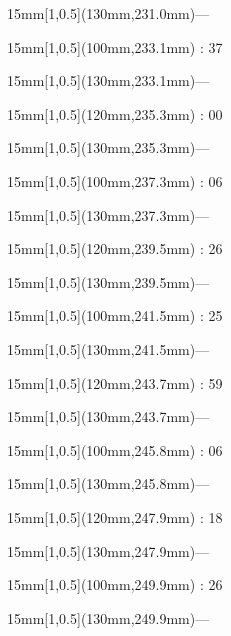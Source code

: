 \documentclass[a4paper]{memoir}
\begin{document}
\begin{textblock*}{15mm}[1,0.5](130mm,231.0mm)\flushright —\end{textblock*}
\begin{textblock*}{15mm}[1,0.5](100mm,233.1mm) : 37\end{textblock*}
\begin{textblock*}{15mm}[1,0.5](130mm,233.1mm)\flushright —\end{textblock*}
\begin{textblock*}{15mm}[1,0.5](120mm,235.3mm) : 00\end{textblock*}
\begin{textblock*}{15mm}[1,0.5](130mm,235.3mm)\flushright —\end{textblock*}
\begin{textblock*}{15mm}[1,0.5](100mm,237.3mm) : 06\end{textblock*}
\begin{textblock*}{15mm}[1,0.5](130mm,237.3mm)\flushright —\end{textblock*}
\begin{textblock*}{15mm}[1,0.5](120mm,239.5mm) : 26\end{textblock*}
\begin{textblock*}{15mm}[1,0.5](130mm,239.5mm)\flushright —\end{textblock*}
\begin{textblock*}{15mm}[1,0.5](100mm,241.5mm) : 25\end{textblock*}
\begin{textblock*}{15mm}[1,0.5](130mm,241.5mm)\flushright —\end{textblock*}
\begin{textblock*}{15mm}[1,0.5](120mm,243.7mm) : 59\end{textblock*}
\begin{textblock*}{15mm}[1,0.5](130mm,243.7mm)\flushright —\end{textblock*}
\begin{textblock*}{15mm}[1,0.5](100mm,245.8mm) : 06\end{textblock*}
\begin{textblock*}{15mm}[1,0.5](130mm,245.8mm)\flushright —\end{textblock*}
\begin{textblock*}{15mm}[1,0.5](120mm,247.9mm) : 18\end{textblock*}
\begin{textblock*}{15mm}[1,0.5](130mm,247.9mm)\flushright —\end{textblock*}
\begin{textblock*}{15mm}[1,0.5](100mm,249.9mm) : 26\end{textblock*}
\begin{textblock*}{15mm}[1,0.5](130mm,249.9mm)\flushright —\end{textblock*}
\end{document}

